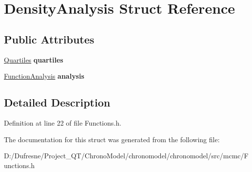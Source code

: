 \hypertarget{struct_density_analysis}{\section{Density\-Analysis Struct Reference}
\label{struct_density_analysis}
}
\subsection*{Public Attributes}
\begin{DoxyCompactItemize}
\item 
\hypertarget{struct_density_analysis_aac627ff430cf24250c3cb929335d5b84}{\hyperlink{struct_quartiles}{Quartiles} {\bfseries quartiles}}\label{struct_density_analysis_aac627ff430cf24250c3cb929335d5b84}

\item 
\hypertarget{struct_density_analysis_a2b6287672af75079db00dea061847d18}{\hyperlink{struct_function_analysis}{Function\-Analysis} {\bfseries analysis}}\label{struct_density_analysis_a2b6287672af75079db00dea061847d18}

\end{DoxyCompactItemize}


\subsection{Detailed Description}


Definition at line 22 of file Functions.\-h.



The documentation for this struct was generated from the following file\-:\begin{DoxyCompactItemize}
\item 
D\-:/\-Dufresne/\-Project\-\_\-\-Q\-T/\-Chrono\-Model/chronomodel/chronomodel/src/mcmc/Functions.\-h\end{DoxyCompactItemize}
